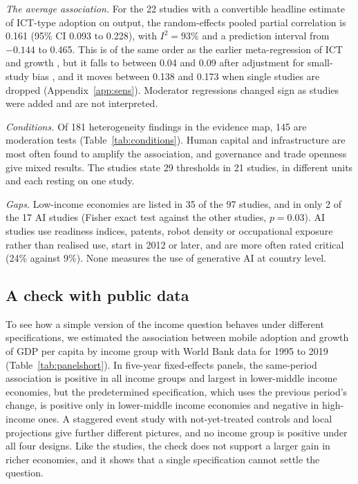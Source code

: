 \documentclass[11pt,a4paper]{article}
\begin{document}



\emph{The average association.} For the 22 studies with a convertible headline estimate of ICT-type adoption on output, the random-effects pooled partial correlation is 0.161 (95\% CI 0.093 to 0.228), with $I^2 = 93\%$ and a prediction interval from $-0.144$ to 0.465. This is of the same order as the earlier meta-regression of ICT and growth \cite{stanley2018}, but it falls to between 0.04 and 0.09 after adjustment for small-study bias \cite{stanley2014}, and it moves between 0.138 and 0.173 when single studies are dropped (Appendix~\ref{app:sens}). Moderator regressions changed sign as studies were added and are not interpreted.

\emph{Conditions.} Of 181 heterogeneity findings in the evidence map, 145 are moderation tests (Table~\ref{tab:conditions}). Human capital and infrastructure are most often found to amplify the association, and governance and trade openness give mixed results. The studies state 29 thresholds in 21 studies, in different units and each resting on one study.



\emph{Gaps.} Low-income economies are listed in 35 of the 97 studies, and in only 2 of the 17 AI studies (Fisher exact test against the other studies, $p = 0.03$). AI studies use readiness indices, patents, robot density or occupational exposure rather than realised use, start in 2012 or later, and are more often rated critical (24\% against 9\%). None measures the use of generative AI at country level.

\subsection{A check with public data}\label{sec:panel}
To see how a simple version of the income question behaves under different specifications, we estimated the association between mobile adoption and growth of GDP per capita by income group with World Bank data for 1995 to 2019 (Table~\ref{tab:panelshort}). In five-year fixed-effects panels, the same-period association is positive in all income groups and largest in lower-middle income economies, but the predetermined specification, which uses the previous period's change, is positive only in lower-middle income economies and negative in high-income ones. A staggered event study with not-yet-treated controls \cite{callaway2021} and local projections \cite{jorda2005} give further different pictures, and no income group is positive under all four designs. Like the studies, the check does not support a larger gain in richer economies, and it shows that a single specification cannot settle the question.
\end{document}
